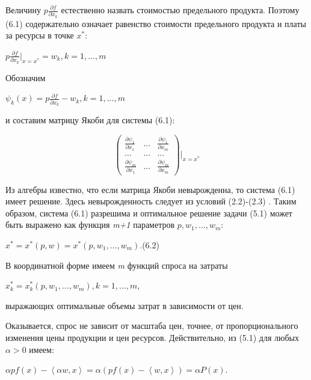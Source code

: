 \documentclass[12pt, 4paper]{book}
\begin{document}
{Величину $p\frac{\partial f}{\partial x_k}$ естественно назвать стоимостью предельного продукта. Поэтому (6.1) содержательно означает равенство стоимости предельного продукта и платы за ресурсы в точке $x^{*}$: 
\begin{center}
$p\frac{\partial f}{\partial x_k}|_{x=x^{*}} = w_k , k=1,...,m$
\end{center}
Обозначим
\begin{center}
$\psi_k(x) = p\frac{\partial f}{\partial x_k} - w_k ,k=1,...,m$
\end{center}
и составим матрицу Якоби для системы (6.1):
\begin{center}
\[
\begin{pmatrix} \frac{\partial \psi_1}{\partial x_1} & \ldots & \frac{\partial \psi_1}{\partial x_m} \\ 
\ldots & \ldots & \ldots  \\
\frac{\partial \psi_m}{\partial x_1}&  \ldots & \frac{\partial \psi_m}{\partial x_m} \end{pmatrix} |_{x = x^{*}}
\]
\end{center}
\par

Из алгебры известно, что если матрица Якоби невырожденна, то система (6.1) имеет решение. Здесь невырожденность следует из условий (2.2)-(2.3) . Таким образом, система (6.1) разрешима и оптимальное решение задачи (5.1) может быть выражено как функция \textit{m+1} параметров $p,w_1,...,w_m$:
\begin{center}
$x^{*}=x^{*}(p,w) = x^{*}(p,w_1,...,w_m)$.(6.2)
\end{center}
\par

В координатной форме имеем \textit{m} функций спроса на затраты 
\begin{center}
$x_{k}^{*}= x_{k}^{*}(p,w_1,...,w_m),k=1,...,m$,
\end{center}
выражающих оптимальные объемы затрат в зависимости от цен. 
\par

Оказывается, спрос не зависит от масштаба цен, точнее, от пропорционального изменения цены продукции и цен ресурсов. Действительно, из (5.1) для любых $\alpha > 0$ имеем: 
\begin{center}
$\alpha p f(x) - \left\langle \alpha w ,x \right\rangle = \alpha (pf(x) - \left\langle w,x\right\rangle) = \alpha P(x).$
\end{center}
\par

}
\end{document}

